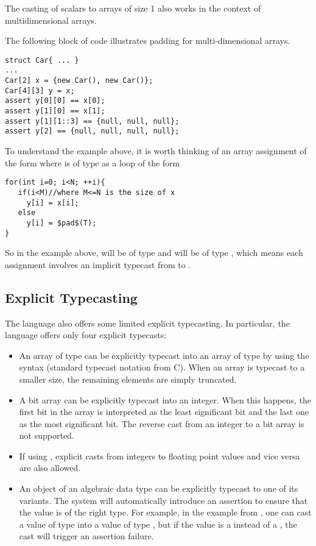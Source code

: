 The casting of scalars to arrays of size 1 also works in the context of multidimensional arrays.
\begin{Example}
The following block of code illustrates padding for multi-dimensional arrays.
\begin{lstlisting}
struct Car{ ... }
...
Car[2] x = {new Car(), new Car()};
Car[4][3] y = x;
assert y[0][0] == x[0];
assert y[1][0] == x[1];
assert y[1][1::3] == {null, null, null};
assert y[2] == {null, null, null, null};
\end{lstlisting}
\end{Example}

To understand the example above, it is worth thinking of an array assignment of the form  where  is of type  as a loop of the form 
\begin{lstlisting}
for(int i=0; i<N; ++i){
   if(i<M)//where M<=N is the size of x
     y[i] = x[i];
   else
     y[i] = $pad$(T);
}
\end{lstlisting}
So in the example above,  will be of type  and  will be of type , which means each assignment involves an implicit typecast from  to .


\subsection{Explicit Typecasting}
The \Sk{} language also offers some limited explicit typecasting. In particular, the language offers only four explicit typecasts:
\begin{itemize}

\item An array  of type  can be explicitly typecast into an array of type  by using the syntax  (standard typecast notation from C). When an array is typecast to a smaller size, the remaining elements are simply truncated. 

\item A bit array  can be explicitly typecast into an integer. When this happens, the first bit in the array is interpreted as the least significant bit and the last one as the most significant bit. The reverse cast from an integer to a bit array is not supported.

\item If using , explicit casts from integers to floating point values and vice versa are also allowed.
\item An object of an algebraic data type can be explicitly typecast to one of its variants. The system will automatically introduce an assertion to ensure that the value is of the right type. For example, in the  example from , one can cast a value of type  into a value of type , but if the value is a  instead of a , the cast will trigger an assertion failure.
\end{itemize}

